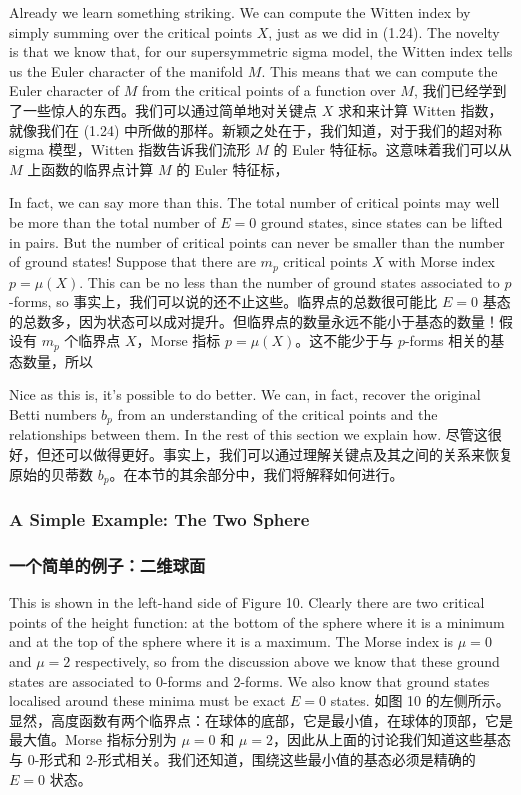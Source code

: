 \documentclass{ctexart}
\begin{document}
\begin{paracol}{2}
Already we learn something striking. We can compute the Witten index by simply summing over the critical points $X$, just as we did in (1.24). The novelty is that we know that, for our supersymmetric sigma model, the Witten index tells us the Euler character of the manifold $M$. This means that we can compute the Euler character of $M$ from the critical points of a function over $M$,
\switchcolumn
我们已经学到了一些惊人的东西。我们可以通过简单地对关键点 $X$ 求和来计算 Witten 指数，就像我们在 (1.24) 中所做的那样。新颖之处在于，我们知道，对于我们的超对称 sigma 模型，Witten 指数告诉我们流形 $M$ 的 Euler 特征标。这意味着我们可以从 $M$ 上函数的临界点计算 $M$ 的 Euler 特征标，
\switchcolumn*

In fact, we can say more than this. The total number of critical points may well be more than the total number of $E = 0$ ground states, since states can be lifted in pairs. But the number of critical points can never be smaller than the number of ground states! Suppose that there are $m_p$ critical points $X$ with Morse index $p = \mu(X)$. This can be no less than the number of ground states associated to $p$-forms, so
\switchcolumn
事实上，我们可以说的还不止这些。临界点的总数很可能比 $E = 0$ 基态的总数多，因为状态可以成对提升。但临界点的数量永远不能小于基态的数量！假设有 $m_p$ 个临界点 $X$，Morse 指标 $p = \mu(X)$。这不能少于与 $p$-forms 相关的基态数量，所以
\switchcolumn*

Nice as this is, it’s possible to do better. We can, in fact, recover the original Betti numbers $b_p$ from an understanding of the critical points and the relationships between them. In the rest of this section we explain how.
\switchcolumn
尽管这很好，但还可以做得更好。事实上，我们可以通过理解关键点及其之间的关系来恢复原始的贝蒂数 $b_p$。在本节的其余部分中，我们将解释如何进行。
\switchcolumn*

\subsubsection*{A Simple Example: The Two Sphere}
\switchcolumn
\subsubsection*{一个简单的例子：二维球面}
\switchcolumn*

This is shown in the left-hand side of Figure 10. Clearly there are two critical points of the height function: at the bottom of the sphere where it is a minimum and at the top of the sphere where it is a maximum. The Morse index is $\mu = 0$ and $\mu = 2$ respectively, so from the discussion above we know that these ground states are associated to 0-forms and 2-forms. We also know that ground states localised around these minima must be exact $E = 0$ states.
\switchcolumn
如图 10 的左侧所示。显然，高度函数有两个临界点：在球体的底部，它是最小值，在球体的顶部，它是最大值。Morse 指标分别为 $\mu = 0$ 和 $\mu = 2$，因此从上面的讨论我们知道这些基态与 0-形式和 2-形式相关。我们还知道，围绕这些最小值的基态必须是精确的 $E = 0$ 状态。
\switchcolumn*


\end{paracol}
\end{document}
